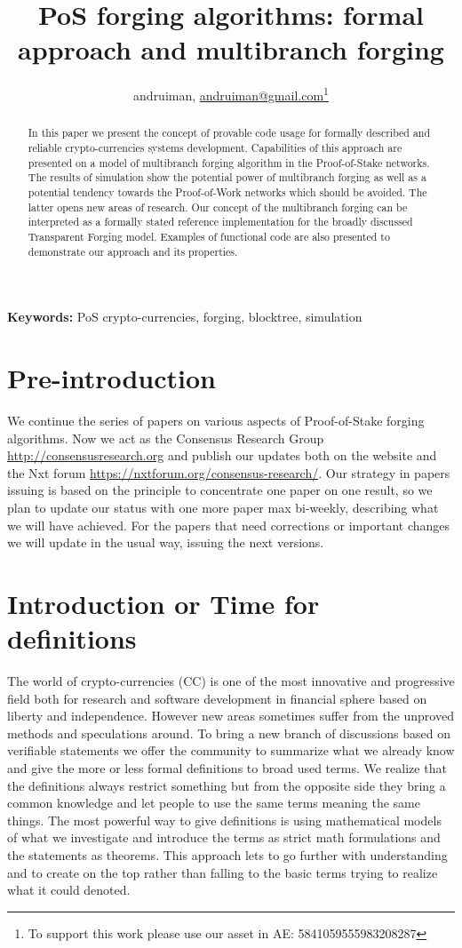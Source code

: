 \documentclass[12pt]{article}
\author{andruiman, \href{maito: andruiman@gmail.com}{andruiman@gmail.com}\footnote{To support this work please use our asset in AE: 5841059555983208287}}
\title{PoS forging algorithms: formal approach and multibranch forging}
\begin{document}
\maketitle
\begin{abstract}
In this paper we present the concept of provable code usage for formally described and reliable crypto-currencies systems development. 
Capabilities of this approach are presented on a model of multibranch forging algorithm in the Proof-of-Stake networks. 
The results of simulation show the potential power of multibranch forging as well as a potential tendency towards the 
Proof-of-Work networks which should be avoided. The latter opens new areas of research. Our concept of the multibranch forging can be interpreted 
as a formally stated reference implementation for the broadly discussed Transparent Forging model. Examples of functional code are also presented to 
demonstrate our approach and its properties.
\end{abstract}

\noindent
{\bf Keywords:} PoS crypto-currencies, forging, blocktree, simulation

\section{Pre-introduction}
We continue the series of papers on various aspects of Proof-of-Stake forging algorithms. Now we act as the Consensus Research 
Group \url{http://consensusresearch.org} and publish our updates both on the website and the Nxt forum \url{https://nxtforum.org/consensus-research/}.
Our strategy in papers issuing is based on the principle to concentrate one paper on one result, so we plan to update our status with one more paper 
max bi-weekly, describing what we will have achieved. For the papers that need corrections or important changes we will update in the usual way,
issuing the next versions. 

\section{Introduction or Time for definitions}
The world of crypto-currencies (CC) is one of the most innovative and progressive field both for research 
and software development in financial sphere based on liberty and independence. However new areas sometimes suffer from the unproved methods and speculations around. To bring a new branch of discussions based on verifiable statements we offer the community to summarize what we already know and give the more or less formal 
definitions to broad used terms. We realize that the definitions always restrict something but from the opposite side they bring a common knowledge and let people 
to use the same terms meaning the same things. The most powerful way to give definitions is using mathematical models of what we investigate and introduce the 
terms as strict math formulations and the statements as theorems. This approach lets to go further with understanding and to create on the top rather than falling to 
the basic terms trying to realize what it could denoted. 
\end{document}
